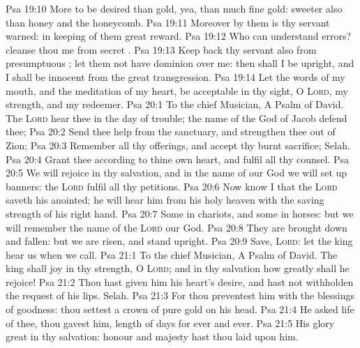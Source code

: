 \vs Psa 19:10 More to be desired  than gold, yea, than much fine gold: sweeter also than honey and the honeycomb.
\vs Psa 19:11 Moreover by them is thy servant warned:  in keeping of them  great reward.
\vs Psa 19:12 Who can understand  errors? cleanse thou me from secret .
\vs Psa 19:13 Keep back thy servant also from presumptuous ; let them not have dominion over me: then shall I be upright, and I shall be innocent from the great transgression.
\vs Psa 19:14 Let the words of my mouth, and the meditation of my heart, be acceptable in thy sight, O \textsc{Lord}, my strength, and my redeemer.
\vs Psa 20:1 To the chief Musician, A Psalm of David. The \textsc{Lord} hear thee in the day of trouble; the name of the God of Jacob defend thee;
\vs Psa 20:2 Send thee help from the sanctuary, and strengthen thee out of Zion;
\vs Psa 20:3 Remember all thy offerings, and accept thy burnt sacrifice; Selah.
\vs Psa 20:4 Grant thee according to thine own heart, and fulfil all thy counsel.
\vs Psa 20:5 We will rejoice in thy salvation, and in the name of our God we will set up  banners: the \textsc{Lord} fulfil all thy petitions.
\vs Psa 20:6 Now know I that the \textsc{Lord} saveth his anointed; he will hear him from his holy heaven with the saving strength of his right hand.
\vs Psa 20:7 Some  in chariots, and some in horses: but we will remember the name of the \textsc{Lord} our God.
\vs Psa 20:8 They are brought down and fallen: but we are risen, and stand upright.
\vs Psa 20:9 Save, \textsc{Lord}: let the king hear us when we call.
\vs Psa 21:1 To the chief Musician, A Psalm of David. The king shall joy in thy strength, O \textsc{Lord}; and in thy salvation how greatly shall he rejoice!
\vs Psa 21:2 Thou hast given him his heart's desire, and hast not withholden the request of his lips. Selah.
\vs Psa 21:3 For thou preventest him with the blessings of goodness: thou settest a crown of pure gold on his head.
\vs Psa 21:4 He asked life of thee,  thou gavest  him,  length of days for ever and ever.
\vs Psa 21:5 His glory  great in thy salvation: honour and majesty hast thou laid upon him.
